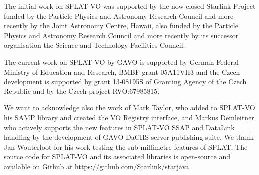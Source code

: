 \documentclass[final,authoryear,5p,times,twocolumn]{elsarticle}
\begin{document}
The initial work on SPLAT-VO was supported
by the now closed Starlink Project funded by the Particle Physics and
Astronomy Research Council and more recently by the Joint Astronomy
Centre, Hawaii, also funded by the Particle Physics and Astronomy
Research Council and more recently by its successor organisation the
Science and Technology Facilities Council.

The current work on SPLAT-VO by GAVO is supported by German Federal
Ministry of Education and Research, BMBF grant 05A11VH3 and the Czech
development is supported by grant 13-08195S of Granting Agency of the
Czech Republic and by the Czech project RVO:67985815.

We want to acknowledge also the work of Mark Taylor, who added to
SPLAT-VO his SAMP library and created the VO Registry interface, and
Markus Demleitner who actively supports the new features in SPLAT-VO SSAP
and DataLink handling by the development of GAVO DaCHS server publishing suite.
We thank Jan Wouterloot for his work testing the sub-millimetre
features of SPLAT.
The source code for SPLAT-VO and its associated libraries is
open-source and available on Github at
\url{https://github.com/Starlink/starjava}









\end{document}
